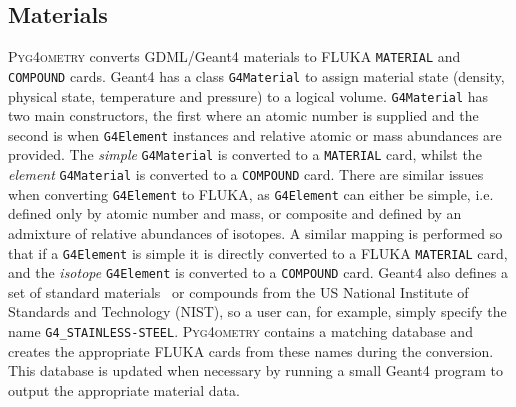 \documentclass[final,5p,times,twocolumn]{elsarticle}
\newcommand{\pyinline}[1]{\lstinline[postbreak={}]{#1}}
\newcommand{\cpinline}[1]{\lstinline[postbreak={}]{#1}}
\newcommand{\fluka}[1]{\texttt{\MakeUppercase{#1}}}
\newcommand{\PYGEOMETRY}{\textsc{Pyg4ometry}}
\begin{document}
\subsection{Materials}
\PYGEOMETRY{} converts GDML/Geant4 materials to FLUKA \verb|MATERIAL| and \verb|COMPOUND| cards.
Geant4 has a class \cpinline{G4Material} to assign material state (density, physical state, temperature and pressure)
to a logical volume. \cpinline{G4Material} has two main constructors, the first where an atomic number is supplied and
the second is when \cpinline{G4Element} instances and relative atomic or mass abundances are provided. The {\em simple}
\cpinline{G4Material} is converted to a \fluka{material} card, whilst the {\em element} \cpinline{G4Material}  is converted to a
\fluka{compound} card. There are similar issues when converting \cpinline{G4Element} to FLUKA, as \cpinline{G4Element}
can either be simple, i.e. defined only by atomic number and mass, or composite and defined by an admixture of
relative abundances of isotopes. A similar mapping is performed so that if a \cpinline{G4Element} is simple it is
directly converted to a FLUKA \fluka{MATERIAL} card, and the {\it isotope} \cpinline{G4Element} is converted to a \fluka{compound}
card. Geant4 also defines a set of standard materials~\cite{Geant4MaterialDB} or compounds from the US National Institute
of Standards and Technology (NIST), so a user can, for example, simply
specify the name \pyinline{G4_STAINLESS-STEEL}. \PYGEOMETRY{}  contains a matching database and creates the appropriate FLUKA
cards from these names during the conversion. This database is updated when
necessary by running a small Geant4 program to output the appropriate material data.
\end{document}
